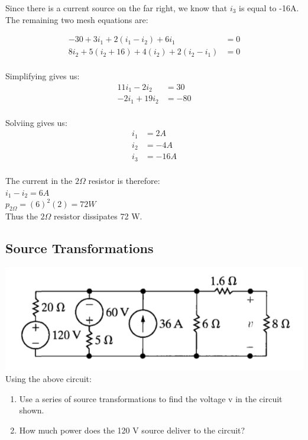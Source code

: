 Since there is a current source on the far right, we know that $i_3$ is equal to -16A. 
The remaining two mesh equations are:

\begin{align*}
	-30 + 3i_1 + 2(i_1 - i_2) + 6i_1 &= 0 \\
	8i_2 + 5(i_2 + 16) + 4(i_2) + 2(i_2 - i_1) &= 0 \\
\end{align*}

Simplifying gives us:
\begin{align*}
	11i_1 - 2i_2 &= 30 \\
	-2i_1 + 19i_2 &= -80 \\
\end{align*}

Solviing gives us:
\begin{align*}
	i_1 &= 2A \\
	i_2 &= -4A \\
	i_3 &= -16 A \\
\end{align*}

The current in the $2\Omega$ resistor is therefore:\\
$i_1 - i_2 = 6A$ \\
$p_{2\Omega} = (6)^2(2) = 72 W $\\

Thus the $2 \Omega$ resistor dissipates 72 W.


\subsection{Source Transformations}


\includegraphics[scale=0.5]{img/c4/p3} \\
Using the above circuit:
\begin{enumerate}
	\item Use a series of source transformations to find the voltage v in the circuit shown.
	\item How much power does the 120 V source deliver to the circuit?
\end{enumerate}

